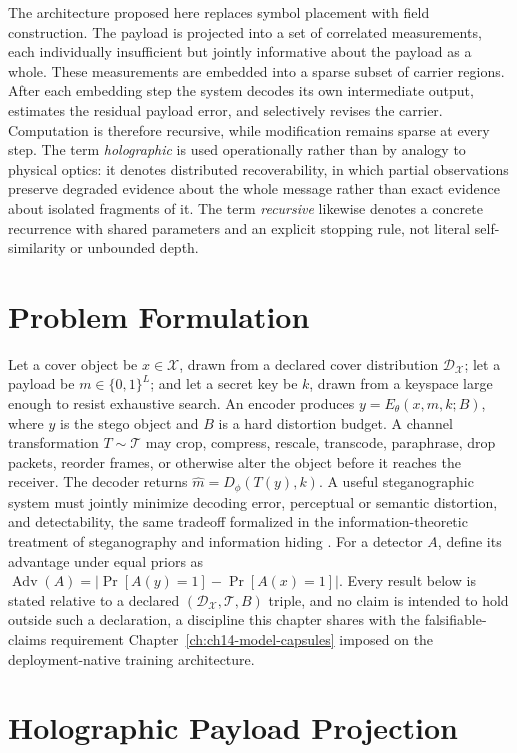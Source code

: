 The architecture proposed here replaces symbol placement with field construction. The payload is projected into a set of correlated measurements, each individually insufficient but jointly informative about the payload as a whole. These measurements are embedded into a sparse subset of carrier regions. After each embedding step the system decodes its own intermediate output, estimates the residual payload error, and selectively revises the carrier. Computation is therefore recursive, while modification remains sparse at every step. The term \emph{holographic} is used operationally rather than by analogy to physical optics: it denotes distributed recoverability, in which partial observations preserve degraded evidence about the whole message rather than exact evidence about isolated fragments of it. The term \emph{recursive} likewise denotes a concrete recurrence with shared parameters and an explicit stopping rule, not literal self-similarity or unbounded depth.

\section{Problem Formulation}

Let a cover object be $x \in \mathcal{X}$, drawn from a declared cover distribution $\mathcal{D}_\mathcal{X}$; let a payload be $m \in \{0,1\}^L$; and let a secret key be $k$, drawn from a keyspace large enough to resist exhaustive search. An encoder produces $y = E_\theta(x,m,k;B)$, where $y$ is the stego object and $B$ is a hard distortion budget. A channel transformation $T \sim \mathcal{T}$ may crop, compress, rescale, transcode, paraphrase, drop packets, reorder frames, or otherwise alter the object before it reaches the receiver. The decoder returns $\hat m = D_\phi(T(y),k)$. A useful steganographic system must jointly minimize decoding error, perceptual or semantic distortion, and detectability, the same tradeoff formalized in the information-theoretic treatment of steganography and information hiding \cite{cachin2004,moulin2003}. For a detector $A$, define its advantage under equal priors as $\operatorname{Adv}(A) = |\Pr[A(y)=1] - \Pr[A(x)=1]|$. Every result below is stated relative to a declared $(\mathcal{D}_\mathcal{X}, \mathcal{T}, B)$ triple, and no claim is intended to hold outside such a declaration, a discipline this chapter shares with the falsifiable-claims requirement Chapter~\ref{ch:ch14-model-capsules} imposed on the deployment-native training architecture.

\section{Holographic Payload Projection}

